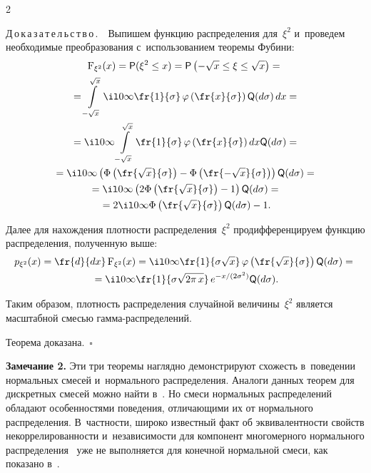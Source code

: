 \begin{multicols}{2}
\smallskip

\noindent
Д\,о\,к\,а\,з\,а\,т\,е\,л\,ь\,с\,т\,в\,о\,.\ \
Выпишем функцию распределения для~$\xi^2$ и~проведем 
необходимые преобразования с~использованием теоремы Фубини:
\begin{multline*}
\mathrm{F}_{\xi^2}(x) = {\sf P} (\xi^2 \leq x) =  {\sf P} \left( -\sqrt{x} \leq \xi \leq \sqrt{x}\right) = {}\\
{}=
\int\limits_{-\sqrt{x}}^{\sqrt{x}} \il 0 \infty \fr{1}{\sigma}\, 
\varphi\left(\fr{x}{\sigma}\right) {\sf Q} (d\sigma)\, {d}x ={} \\
{}= \il 0 \infty \int\limits_{-\sqrt{x}}^{\sqrt{x}} \fr{1}{\sigma} \,
\varphi\left(\fr{x}{\sigma}\right)  {d}x {\sf Q} (d\sigma) = {}\\
{}=
\il 0 \infty \left(\Phi\left(\fr{\sqrt{x}}{\sigma}\right) - \Phi\left(\fr{-\sqrt{x}}{\sigma}\right)\right) 
{\sf Q} (d\sigma) = {}\\
{}= \il 0 \infty \left( 2 \Phi\left(\fr{\sqrt{x}}{\sigma}\right) - 1\right) {\sf Q} (d\sigma) ={}\\
{}=
 2 \il 0 \infty \Phi\left(\fr{\sqrt{x}}{\sigma}\right) {\sf Q} (d\sigma) - 1.
\end{multline*}

Далее для нахождения плотности распределения~$\xi^2$ продифференцируем функцию распределения, полученную выше:
\begin{multline*}
{p}_{\xi^2}(x) = \fr{{d}}{{d}x}\,\mathrm{F}_{\xi^2}(x) = 
\il 0 \infty \fr{1}{\sigma \sqrt{x}} \,\varphi\left(\fr{\sqrt{x}}{\sigma}\right)
 {\sf Q} (d\sigma) ={}\\
 {}=
  \il 0 \infty \fr{1}{\sigma \sqrt{2\pi \, x}}\, e^{-{x}/({2\sigma^2})} {\sf Q} (d\sigma).
\end{multline*}

Таким образом, плотность распределения случайной величины~$\xi^2$ является масштабной 
смесью гам\-ма-рас\-пре\-де\-ле\-ний.


Теорема доказана.~\hfill$\square$

\smallskip

\noindent
\textbf{Замечание 2.} Эти три теоремы наглядно демонстрируют схожесть в~поведении 
нормальных смесей и~нормального распределения. Аналоги данных теорем для дискретных 
смесей можно найти в~\cite{simple_mix}. Но смеси нормальных распределений обладают 
особенностями поведения, отличающими их от нормального распределения.
В~част\-ности, широко известный факт об эквивалентности свойств некоррелированности 
и~независимости для компонент многомерного нормального распределения~\cite{borovkov}
уже не выполняется для конечной нормальной смеси, как показано в~\cite{simple_mix}.


\end{multicols}
